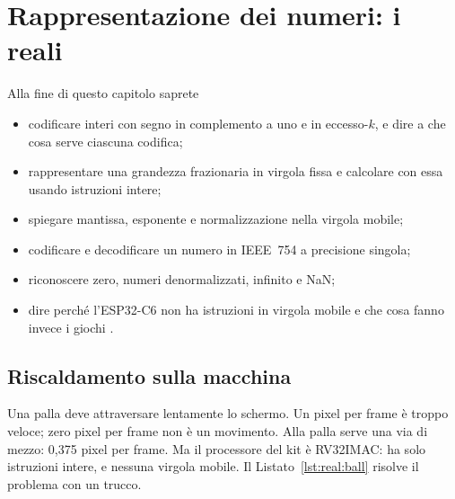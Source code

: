 \chapter{Rappresentazione dei numeri: i reali}
\label{ch:reals}


\begin{chapgoals}
Alla fine di questo capitolo saprete
\begin{itemize}
\item codificare interi con segno in complemento a uno e in eccesso-$k$, e dire a che cosa serve ciascuna codifica;
\item rappresentare una grandezza frazionaria in virgola fissa e calcolare con essa usando istruzioni intere;
\item spiegare mantissa, esponente e normalizzazione nella virgola mobile;
\item codificare e decodificare un numero in IEEE~754 a precisione singola;
\item riconoscere zero, numeri denormalizzati, infinito e NaN;
\item dire perché l'ESP32-C6 non ha istruzioni in virgola mobile e che cosa fanno invece i giochi \prg.
\end{itemize}
\end{chapgoals}


\section{Riscaldamento sulla macchina}

Una palla deve attraversare lentamente lo schermo. Un pixel per frame è troppo
veloce; zero pixel per frame non è un movimento. Alla palla serve una via di
mezzo: 0,375 pixel per frame. Ma il processore del kit è RV32IMAC: ha solo
istruzioni intere, e nessuna virgola mobile. Il Listato~\ref{lst:real:ball}
risolve il problema con un trucco.


